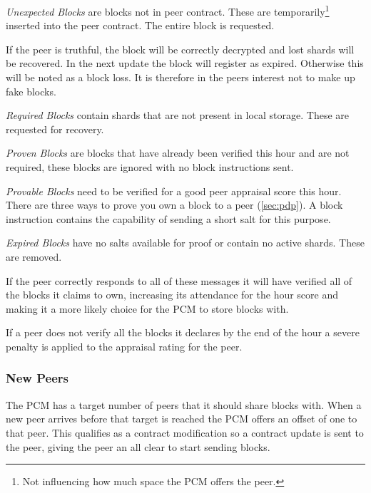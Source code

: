 \documentclass[11pt, a4paper, twoside]{report}
\begin{document}
\emph{Unexpected Blocks} are blocks not in peer contract. These are temporarily\footnote{Not influencing how much space the PCM offers the peer.} inserted into the peer contract. The entire block is requested.

If the peer is truthful, the block will be correctly decrypted and lost shards will be recovered. In the next update the block will register as expired. Otherwise this will be noted as a block loss. It is therefore in the peers interest not to make up fake blocks.

\emph{Required Blocks} contain shards that are not present in local storage. These are requested for recovery.

\emph{Proven Blocks} are blocks that have already been verified this hour and are not required, these blocks are ignored with no block instructions sent.

\emph{Provable Blocks} need to be verified for a good peer appraisal score this hour. There are three ways to prove you own a block to a peer (\ref{sec:pdp}). A block instruction contains the capability of sending a short salt for this purpose.

\emph{Expired Blocks} have no salts available for proof or contain no active shards. These are removed.

If the peer correctly responds to all of these messages it will have verified all of the blocks it claims to own, increasing its attendance for the hour score and making it a more likely choice for the PCM to store blocks with.

If a peer does not verify all the blocks it declares by the end of the hour a severe penalty is applied to the appraisal rating for the peer.

\subsubsection{New Peers}

The PCM has a target number of peers that it should share blocks with. When a new peer arrives before that target is reached the PCM offers an offset of one to that peer. This qualifies as a contract modification so a contract update is sent to the peer, giving the peer an all clear to start sending blocks.
\end{document}
